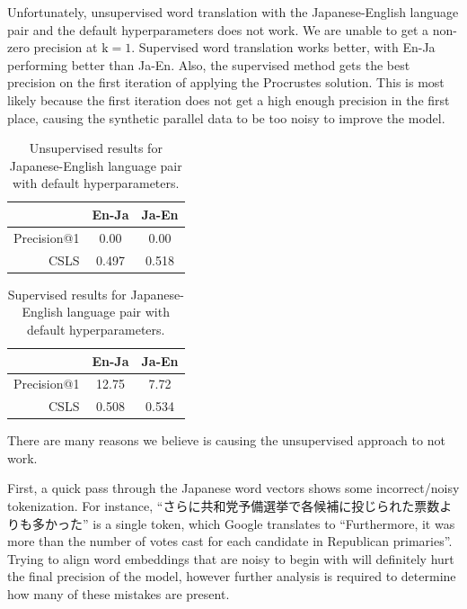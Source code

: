 \documentclass{article}
\begin{document}
Unfortunately, unsupervised word translation with the Japanese-English language
pair and the default hyperparameters does not work. We are unable to get a
non-zero precision at $\text{k}=1$. Supervised word translation works better,
with En-Ja performing better than Ja-En. Also, the supervised method gets the best
precision on the first iteration of applying the Procrustes solution. This is most
likely because the first iteration does not get a high enough precision in the 
first place, causing the synthetic parallel data to be too noisy to improve the
model.

\begin{table}[h]
  \centering
  \begin{tabular}{r| c | c}
    \toprule
    & En-Ja & Ja-En \\
    \midrule
    Precision@1 &  0.00 &  0.00 \\
    CSLS        & 0.497 & 0.518 \\
    \bottomrule
  \end{tabular}
  \caption{Unsupervised results for Japanese-English language pair with default hyperparameters.}
\end{table}

\begin{table}[h]
  \centering
  \begin{tabular}{r| c | c}
    \toprule
    & En-Ja & Ja-En \\
    \midrule
    Precision@1 & 12.75 &  7.72 \\
    CSLS        & 0.508 & 0.534 \\
    \bottomrule
  \end{tabular}
  \caption{Supervised results for Japanese-English language pair with default hyperparameters.}
\end{table}

\noindent
There are many reasons we believe is causing the unsupervised approach to not work.

First, a quick pass through the Japanese word vectors shows some incorrect/noisy
tokenization. For instance, ``さらに共和党予備選挙で各候補に投じられた票数よりも多かった''
is a single token, which Google translates to ``Furthermore, it was more than
the number of votes cast for each candidate in Republican primaries''. Trying to
align word embeddings that are noisy to begin with will definitely hurt the final
precision of the model, however further analysis is required to determine how
many of these mistakes are present.
\end{document}
